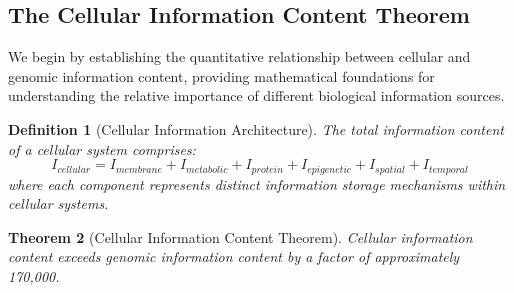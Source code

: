 \documentclass[12pt,a4paper]{article}
\newtheorem{theorem}{Theorem}[section]
\newtheorem{definition}[theorem]{Definition}
\begin{document}
\subsection{The Cellular Information Content Theorem}

We begin by establishing the quantitative relationship between cellular and genomic information content, providing mathematical foundations for understanding the relative importance of different biological information sources.

\begin{definition}[Cellular Information Architecture]
The total information content of a cellular system comprises:
\begin{equation}
I_{cellular} = I_{membrane} + I_{metabolic} + I_{protein} + I_{epigenetic} + I_{spatial} + I_{temporal}
\end{equation}
where each component represents distinct information storage mechanisms within cellular systems.
\end{definition}

\begin{theorem}[Cellular Information Content Theorem]
Cellular information content exceeds genomic information content by a factor of approximately 170,000.
\end{theorem}
\end{document}
